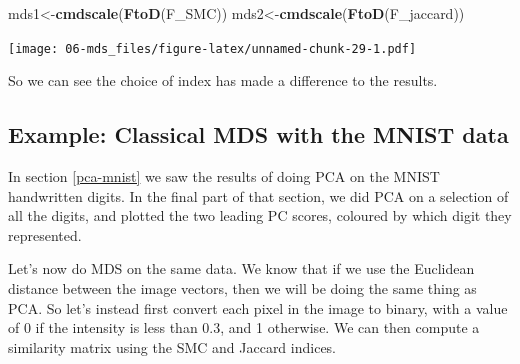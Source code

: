 \documentclass[]{book}
\newenvironment{Shaded}{\begin{snugshade}}{\end{snugshade}}
\newcommand{\KeywordTok}[1]{\textcolor[rgb]{0.13,0.29,0.53}{\textbf{#1}}}
\newcommand{\NormalTok}[1]{#1}
\theoremstyle{definition}
\theoremstyle{definition}
\theoremstyle{definition}
\theoremstyle{remark}
\begin{document}
\begin{Shaded}
\begin{Highlighting}[]
\NormalTok{mds1<-}\KeywordTok{cmdscale}\NormalTok{(}\KeywordTok{FtoD}\NormalTok{(F_SMC))}
\NormalTok{mds2<-}\KeywordTok{cmdscale}\NormalTok{(}\KeywordTok{FtoD}\NormalTok{(F_jaccard))}
\end{Highlighting}
\end{Shaded}

\texttt{[image: 06-mds\_files/figure-latex/unnamed-chunk-29-1.pdf]}

So we can see the choice of index has made a difference to the results.

\hypertarget{example-classical-mds-with-the-mnist-data}{%
\subsection{Example: Classical MDS with the MNIST data}\label{example-classical-mds-with-the-mnist-data}}

In section \ref{pca-mnist} we saw the results of doing PCA on the MNIST handwritten digits. In the final part of that section, we did PCA on a selection of all the digits, and plotted the two leading PC scores, coloured by which digit they represented.

Let's now do MDS on the same data. We know that if we use the Euclidean distance between the image vectors, then we will be doing the same thing as PCA. So let's instead first convert each pixel in the image to binary, with a value of 0 if the intensity is less than 0.3, and 1 otherwise. We can then compute a similarity matrix using the SMC and Jaccard indices.
\end{document}
